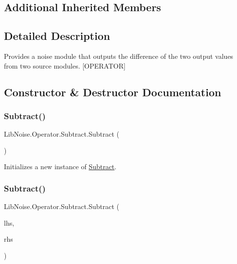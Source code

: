 \subsection*{Additional Inherited Members}


\subsection{Detailed Description}
Provides a noise module that outputs the difference of the two output values from two source modules. \mbox{[}O\+P\+E\+R\+A\+T\+OR\mbox{]} 



\subsection{Constructor \& Destructor Documentation}
\mbox{\label{class_lib_noise_1_1_operator_1_1_subtract_a28cd0a57fb54d9d643f084413f404b51}} 
\subsubsection{\texorpdfstring{Subtract()}{Subtract()}\hspace{0.1cm}{\footnotesize\ttfamily [1/2]}}
{\footnotesize\ttfamily Lib\+Noise.\+Operator.\+Subtract.\+Subtract (\begin{DoxyParamCaption}{ }\end{DoxyParamCaption})}



Initializes a new instance of \hyperlink{class_lib_noise_1_1_operator_1_1_subtract}{Subtract}. 

\mbox{\label{class_lib_noise_1_1_operator_1_1_subtract_a49e300a6e37f7dfe32b467aa67ab583c}} 
\subsubsection{\texorpdfstring{Subtract()}{Subtract()}\hspace{0.1cm}{\footnotesize\ttfamily [2/2]}}
{\footnotesize\ttfamily Lib\+Noise.\+Operator.\+Subtract.\+Subtract (\begin{DoxyParamCaption}\item[{\hyperlink{class_lib_noise_1_1_module_base}{Module\+Base}}]{lhs,  }\item[{\hyperlink{class_lib_noise_1_1_module_base}{Module\+Base}}]{rhs }\end{DoxyParamCaption})}



